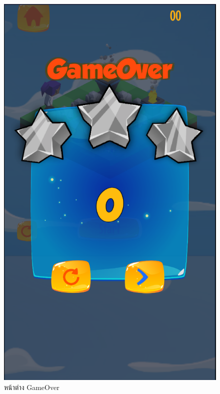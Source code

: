 \begin{figure}[h!]
\begin{center}
\includegraphics[scale = 0.3]{pic/GameOver1.png}
\end{center}
\caption[หน้าต่าง GameOver]{หน้าต่าง GameOver}
\label{lose}
\end{figure}


